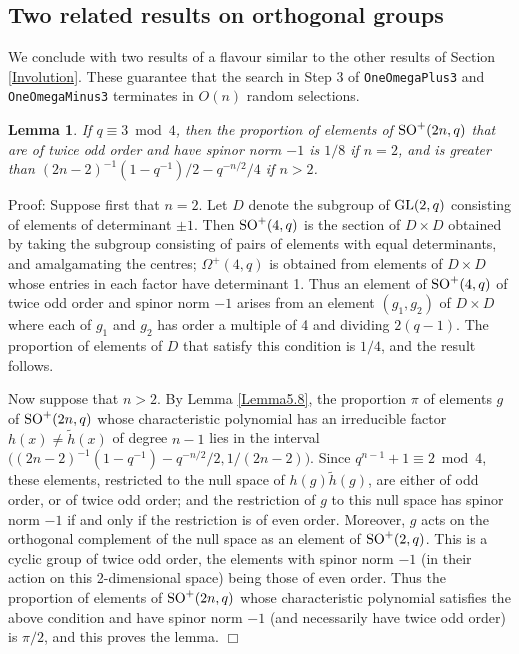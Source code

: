 \documentclass[12pt]{article}
\newtheorem{lemma}[definition]{Lemma}
\newenvironment{proof}{\normalsize {\sc Proof}:}{{\hfill $\Box$ \\}}
\def\SO{{\rm SO}}
\def\GL{{\rm GL}}
\def\Oh{O}  %
\begin{document}
\subsection{Two related results on orthogonal groups}
We conclude with two results of a flavour similar to 
the other results of Section \ref{Involution}.
These guarantee
that the search in Step 3 of {\tt OneOmegaPlus3}
and {\tt OneOmegaMinus3} terminates 
in $\Oh(n)$ random selections.

\begin{lemma}\label{extra}
If $q\equiv3\bmod4$, then  the proportion of elements 
of $\SO^+(2n,q)$ that are
of twice odd order and have spinor norm $-1$ is $1/8$ if $n=2$, and
is greater than 
$(2n-2)^{-1}(1-q^{-1})/2-q^{-n/2}/4$ if $n>2$.
\end{lemma}
\begin{proof}
Suppose first that $n=2$.  Let $D$ denote the subgroup 
of $\GL(2,q)$ consisting
of elements of determinant $\pm1$.  
Then $\SO^+(4,q)$ is the section of $D\times D$
obtained by taking the subgroup consisting of pairs of 
elements with equal determinants,
and amalgamating the centres;  
$\Omega^+(4,q)$ is obtained from elements of 
$D\times D$ whose entries in each 
factor have determinant 1. Thus an element of 
$\SO^+(4,q)$ of twice odd order and
spinor norm $-1$ arises from an element 
$(g_1,g_2)$ of $D\times D$ where each of $g_1$ and $g_2$
has order a multiple of 4 and dividing $2(q-1)$.  The 
proportion of elements of
$D$ that satisfy this condition is $1/4$, and the result follows.

Now suppose that $n>2$.
By Lemma \ref{Lemma5.8}, the proportion $\pi$ of elements 
$g$ of $\SO^+(2n,q)$ whose
characteristic polynomial has an irreducible factor 
$h(x)\ne\tilde{h}(x)$ of degree $n-1$ 
lies in the interval $\big((2n-2)^{-1}(1-q^{-1})-q^{-n/2}/2,1/(2n-2)\bigl)$.
Since $q^{n-1}+1\equiv2\bmod4$, these elements, restricted to the 
null space of $h(g)\tilde{h}(g)$,
are either of odd order, or of twice odd order; and the restriction of 
$g$ to this null space has spinor norm $-1$ if and only if
the restriction is of even order.
Moreover, $g$ acts on the orthogonal complement of the 
null space as an element of
$\SO^+(2,q)$. %
This is a cyclic group of twice odd order,
the elements with spinor norm $-1$ (in their action on 
this 2-dimensional space)
being those of even order.  Thus the proportion of 
elements of $\SO^+(2n,q)$ whose 
characteristic polynomial satisfies the above condition 
and have spinor norm $-1$ (and
necessarily have twice odd order) is $\pi/2$, and this proves the lemma.
\end{proof}
\end{document}
